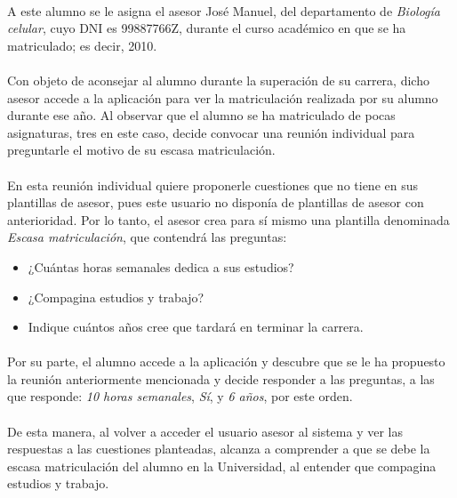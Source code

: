   \paragraph{}A este alumno se le asigna el asesor José Manuel, del departamento
  de \textit{Biología celular}, cuyo DNI es 99887766Z, durante el curso
  académico en que se ha matriculado; es decir, 2010.

  \paragraph{}Con objeto de aconsejar al alumno durante la superación de su
  carrera, dicho asesor accede a la aplicación para ver la matriculación
  realizada por su alumno durante ese año. Al observar que el alumno se ha
  matriculado de pocas asignaturas, tres en este caso, decide convocar una
  reunión individual para preguntarle el motivo de su escasa matriculación.

  \paragraph{}En esta reunión individual quiere proponerle cuestiones que no
  tiene en sus plantillas de asesor, pues este usuario no disponía de plantillas
  de asesor con anterioridad. Por lo tanto, el asesor crea para sí mismo una
  plantilla denominada \textit{Escasa matriculación}, que contendrá las
  preguntas:

  \begin{itemize}
   \item ¿Cuántas horas semanales dedica a sus estudios?
   \item ¿Compagina estudios y trabajo?
   \item Indique cuántos años cree que tardará en terminar la carrera.
  \end{itemize}

  \paragraph{}Por su parte, el alumno accede a la aplicación y descubre que se
  le ha propuesto la reunión anteriormente mencionada y decide responder a las
  preguntas, a las que responde: \textit{10 horas semanales},
  \textit{Sí}, y \textit{6 años}, por este orden.

  \paragraph{}De esta manera, al volver a acceder el usuario asesor al sistema
  y ver las respuestas a las cuestiones planteadas, alcanza a comprender a que
  se debe la escasa matriculación del alumno en la Universidad, al entender que
  compagina estudios y trabajo.

